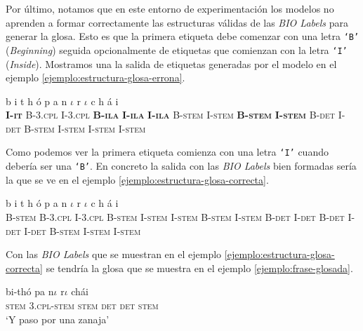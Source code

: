 \documentclass[letterpaper,12pt,oneside]{book}
\def\code#1{\texttt{#1}}
\theoremstyle{definition}
\begin{document}
Por último, notamos que en este entorno de experimentación los modelos no aprenden a formar correctamente las estructuras válidas de las \textit{BIO Labels} para generar la glosa. Esto es que la primera etiqueta debe comenzar con una letra \code{`B'} (\textit{Beginning}) seguida opcionalmente de etiquetas que comienzan con la letra \code{`I'} (\textit{Inside}). Mostramos una la salida de etiquetas generadas por el modelo en el ejemplo \ref{ejemplo:estructura-glosa-errona}.

\begin{exe}
    \ex {} {b} {i} {t} {h} {ó} {p} {a} {n} {$\iota$} {r} {$\iota$} {c} {h} {á} {i}\\
    {\textbf{\textsc{I-it}}} {\textsc{B-3.cpl}} {\textsc{I-3.cpl}} {\textbf{\textsc{B-ila}}} {\textbf{\textsc{I-ila}}} {\textbf{\textsc{I-ila}}} {\textsc{B-stem}} {\textsc{I-stem}} {\textbf{\textsc{B-stem}}} {\textbf{\textsc{I-stem}}} {\textsc{B-det}} {\textsc{I-det}} {\textsc{B-stem}} {\textsc{I-stem}} {\textsc{I-stem}}  {\textsc{I-stem}}\\\label{ejemplo:estructura-glosa-errona}
\end{exe}

Como podemos ver la primera etiqueta comienza con una letra \code{`I'} cuando debería ser una \code{`B'}. En concreto la salida con las \textit{BIO  Labels} bien formadas sería la que se ve en el ejemplo \ref{ejemplo:estructura-glosa-correcta}.

\begin{exe}
    \ex {} {b} {i} {t} {h} {ó} {p} {a} {n} {$\iota$} {r} {$\iota$} {c} {h} {á} {i}\\
    {\textsc{B-stem}} {\textsc{B-3.cpl}} {\textsc{I-3.cpl}} {\textsc{B-stem}} {\textsc{I-stem}} {\textsc{I-stem}} {\textsc{B-stem}} {\textsc{I-stem}} {\textsc{B-det}} {\textsc{I-det}} {\textsc{B-det}} {\textsc{I-det}} {\textsc{I-det}} {\textsc{B-stem}} {\textsc{I-stem}} {\textsc{I-stem}}\\\label{ejemplo:estructura-glosa-correcta}
\end{exe}

Con las \textit{BIO Labels} que se muestran en el ejemplo \ref{ejemplo:estructura-glosa-correcta} se tendría la glosa que se muestra en el ejemplo \ref{ejemplo:frase-glosada}.

\begin{exe}
    \ex {} {bi-thó} {pa} {n$\iota$} {r$\iota$} {chái}\\
    {\textsc{stem}} {\textsc{3.cpl-stem}} {\textsc{stem}} {\textsc{det}} {\textsc{det}} {\textsc{stem}}\\
    \trans `Y paso por una zanaja'\label{ejemplo:frase-glosada}
\end{exe}
\end{document}
